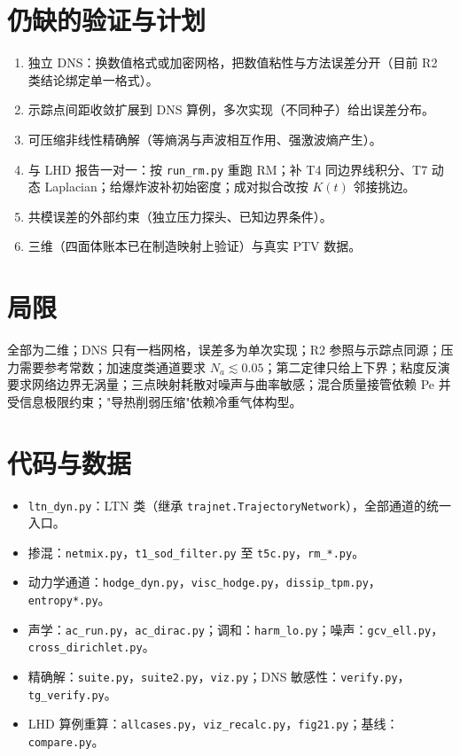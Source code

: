 \documentclass[11pt,a4paper]{article}
\begin{document}
\section{仍缺的验证与计划}
\begin{enumerate}
\item 独立 DNS：换数值格式或加密网格，把数值粘性与方法误差分开（目前 R2 类结论绑定单一格式）。
\item 示踪点间距收敛扩展到 DNS 算例，多次实现（不同种子）给出误差分布。
\item 可压缩非线性精确解（等熵涡与声波相互作用、强激波熵产生）。
\item 与 LHD 报告一对一：按 \texttt{run\_rm.py} 重跑 RM；补 T4 同边界线积分、T7 动态 Laplacian；给爆炸波补初始密度；成对拟合改按 $K(t)$ 邻接挑边。
\item 共模误差的外部约束（独立压力探头、已知边界条件）。
\item 三维（四面体账本已在制造映射上验证）与真实 PTV 数据。
\end{enumerate}

\section{局限}
全部为二维；DNS 只有一档网格，误差多为单次实现；R2 参照与示踪点同源；压力需要参考常数；加速度类通道要求 $N_a\lesssim0.05$；第二定律只给上下界；粘度反演要求网络边界无涡量；三点映射耗散对噪声与曲率敏感；混合质量接管依赖 Pe 并受信息极限约束；"导热削弱压缩"依赖冷重气体构型。

\appendix
\section{代码与数据}
\begin{itemize}
\item \texttt{ltn\_dyn.py}：LTN 类（继承 \texttt{trajnet.TrajectoryNetwork}），全部通道的统一入口。
\item 掺混：\texttt{netmix.py}，\texttt{t1\_sod\_filter.py} 至 \texttt{t5c.py}，\texttt{rm\_*.py}。
\item 动力学通道：\texttt{hodge\_dyn.py}，\texttt{visc\_hodge.py}，\texttt{dissip\_tpm.py}，\texttt{entropy*.py}。
\item 声学：\texttt{ac\_run.py}，\texttt{ac\_dirac.py}；调和：\texttt{harm\_lo.py}；噪声：\texttt{gcv\_ell.py}，\texttt{cross\_dirichlet.py}。
\item 精确解：\texttt{suite.py}，\texttt{suite2.py}，\texttt{viz.py}；DNS 敏感性：\texttt{verify.py}，\texttt{tg\_verify.py}。
\item LHD 算例重算：\texttt{allcases.py}，\texttt{viz\_recalc.py}，\texttt{fig21.py}；基线：\texttt{compare.py}。
\end{itemize}
\end{document}
